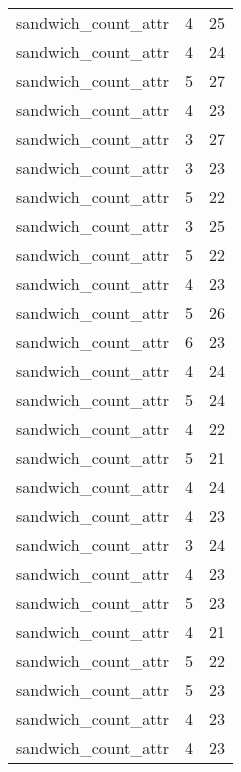 \begin{table}
\begin{tabular}{lrr}
             sandwich\_count\_attr &         4 &        25 \\
             sandwich\_count\_attr &         4 &        24 \\
             sandwich\_count\_attr &         5 &        27 \\
             sandwich\_count\_attr &         4 &        23 \\
             sandwich\_count\_attr &         3 &        27 \\
             sandwich\_count\_attr &         3 &        23 \\
             sandwich\_count\_attr &         5 &        22 \\
             sandwich\_count\_attr &         3 &        25 \\
             sandwich\_count\_attr &         5 &        22 \\
             sandwich\_count\_attr &         4 &        23 \\
             sandwich\_count\_attr &         5 &        26 \\
             sandwich\_count\_attr &         6 &        23 \\
             sandwich\_count\_attr &         4 &        24 \\
             sandwich\_count\_attr &         5 &        24 \\
             sandwich\_count\_attr &         4 &        22 \\
             sandwich\_count\_attr &         5 &        21 \\
             sandwich\_count\_attr &         4 &        24 \\
             sandwich\_count\_attr &         4 &        23 \\
             sandwich\_count\_attr &         3 &        24 \\
             sandwich\_count\_attr &         4 &        23 \\
             sandwich\_count\_attr &         5 &        23 \\
             sandwich\_count\_attr &         4 &        21 \\
             sandwich\_count\_attr &         5 &        22 \\
             sandwich\_count\_attr &         5 &        23 \\
             sandwich\_count\_attr &         4 &        23 \\
             sandwich\_count\_attr &         4 &        23 \\

\end{tabular}
\end{table}
